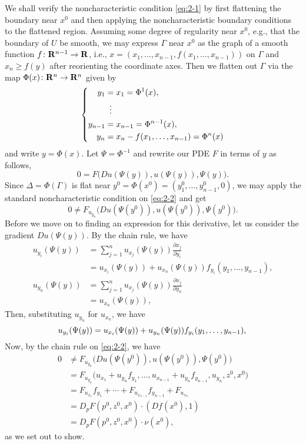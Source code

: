 \begin{solution}
  We shall verify the noncharacteristic condition \eqref{eq:2-1} by first
  flattening the boundary near \(x^0\) and then applying the
  noncharacteristic boundary conditions to the flattened region. Assuming
  some degree of regularity near \(x^0\), e.g., that the boundary of \(U\)
  be smooth, we may express \(\Gamma\) near \(x^0\) as the graph of a
  smooth function \(f\colon\mathbf{R}^{n-1}\to\mathbf{R}\), i.e.,
  \(x=(x_1,\dotsc,x_{n-1},f(x_1,\dotsc,x_{n-1}))\) on \(\Gamma\) and
  \(x_n\geq f(y)\) after reorienting the coordinate axes. Then we flatten
  out \(\Gamma\) via the map \(\Phi(x)\colon\mathbf{R}^n\to\mathbf{R}^n\) given by
  \[
    \left\{
      \begin{aligned}
        y_1&=x_1=\Phi^1(x),\\
        &\vdotswithin{=}\\
        y_{n-1}&=x_{n-1}=\Phi^{n-1}(x),\\
        y_n&=x_n-f(x_1,\dotsc,x_{n-1})=\Phi^n(x)
      \end{aligned}
    \right.
  \]
  and write \(y=\Phi(x)\). Let \(\Psi=\Phi^{-1}\) and rewrite our PDE \(F\)
  in terms of \(y\) as follows,
  \begin{equation}
    \label{eq:2-2}
    0=F\bigl(Du(\Psi(y)),u(\Psi(y)),\Psi(y)\bigr).
  \end{equation}
  Since \(\Delta=\Phi(\Gamma)\) is flat near
  \(y^0=\Phi(x^0)=(y_1^0,\dotsc,y_{n-1}^0,0)\), we may apply the standard
  noncharacteristic condition on \eqref{eq:2-2} and get
  \[
    0\neq F_{u_{y_n}}\bigl(Du(\Psi(y^0)),u(\Psi(y^0)),\Psi(y^0)\bigr).
  \]
  Before we move on to finding an expression for this derivative, let us
  consider the gradient \(Du(\Psi(y))\). By the chain rule, we have
  \begin{align*}
    u_{y_i}(\Psi(y))
    &=\sum_{j=1}^n u_{x_j}(\Psi(y))\frac{\partial x_j}{\partial y_i}\\
    &=u_{x_i}(\Psi(y))+u_{x_n}(\Psi(y))f_{y_i}(y_1,\dotsc,y_{n-1}),\\
    u_{y_n}(\Psi(y))
    &=\sum_{j=1}^n u_{x_j}(\Psi(y))\frac{\partial x_j}{\partial y_n}\\
    &=u_{x_n}(\Psi(y)),
  \end{align*}
  Then, substituting \(u_{y_n}\) for \(u_{x_n}\), we have
  \[
    u_{y_i}(\Psi(y))=u_{x_i}(\Psi(y))+u_{y_n}(\Psi(y))f_{y_i}(y_1,\dotsc,y_{n-1}),\\
  \]
  Now, by the chain rule on \eqref{eq:2-2}, we have
  \begin{align*}
    0&\neq F_{u_{y_n}}\bigl(Du(\Psi(y^0)),u(\Psi(y^0)),\Psi(y^0)\bigr)\\
     &=F_{u_{y_n}}
       \bigl(
       u_{x_1}+u_{y_n}f_{y_1},\dotsc,
       u_{x_{n-1}}+u_{y_n}f_{y_{n-1}},u_{y_n},z^0,x^0
       \bigr)\\
     &=F_{u_{x_1}}f_{y_1}+\dotsb+F_{u_{x_{n-1}}}f_{y_{n-1}}+F_{u_{x_n}}\\
     &=D_pF(p^0,z^0,x^0)\cdot(Df(x^0),1)\\
     &=D_pF(p^0,z^0,x^0)\cdot\nu(x^0),
  \end{align*}
  as we set out to show.
\end{solution}

